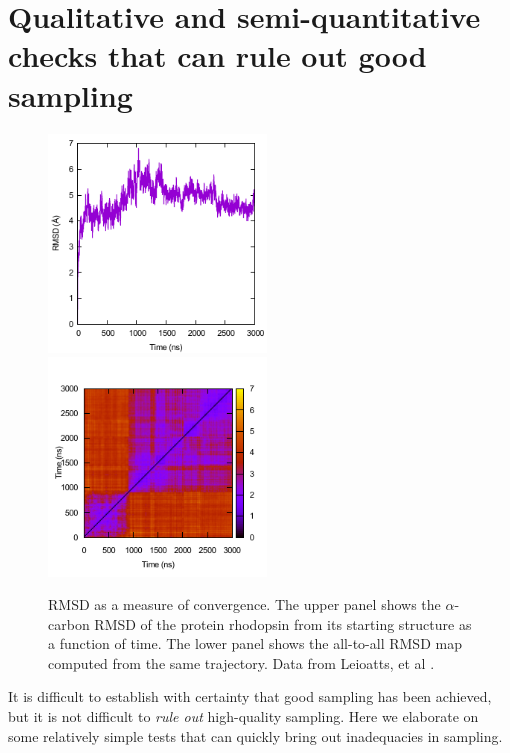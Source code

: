 
\section{Qualitative and semi-quantitative checks that can rule out good sampling}
\label{sec:quick}

\begin{figure}
\centering
   \includegraphics[width=5.8cm]{figures/rmsd}
  \includegraphics[width=5.8cm]{figures/rmsds}
  \caption{
  \label{f:rmsd} RMSD as a measure of convergence.  The upper panel shows the
  $\alpha$-carbon RMSD of the protein rhodopsin from its starting structure as a
  function of time.  The lower panel shows the all-to-all RMSD map computed from the same
  trajectory.  Data from Leioatts, et al \cite{Grossfield-2015}.
  }
\end{figure}

It is difficult to establish with certainty that good sampling has been achieved, but it is not difficult to \emph{rule out} high-quality sampling.
Here we elaborate on some relatively simple tests that can quickly bring out inadequacies in sampling.

